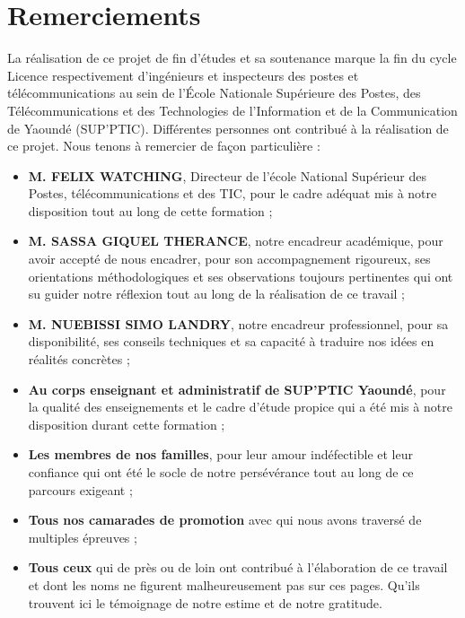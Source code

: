 \chapter*{Remerciements}

La réalisation de ce projet de fin d’études et sa soutenance marque la fin du cycle Licence respectivement d’ingénieurs et inspecteurs des postes et télécommunications au sein de l’École Nationale Supérieure des Postes, des Télécommunications et des Technologies de l’Information et de la Communication de Yaoundé (SUP’PTIC). Différentes personnes ont contribué à la réalisation de ce projet. Nous tenons à remercier de façon particulière :

\begin{itemize}
    \item \textbf{M. FELIX WATCHING}, Directeur de l’école National Supérieur des Postes, télécommunications et des TIC, pour le cadre adéquat mis à notre disposition tout au long de cette formation ;
    
    \item \textbf{M. SASSA GIQUEL THERANCE}, notre encadreur académique, pour avoir accepté de nous encadrer, pour son accompagnement rigoureux, ses orientations méthodologiques et ses observations toujours pertinentes qui ont su guider notre réflexion tout au long de la réalisation de ce travail ;
    
    \item \textbf{M. NUEBISSI SIMO LANDRY}, notre encadreur professionnel, pour sa disponibilité, ses conseils techniques et sa capacité à traduire nos idées en réalités concrètes ;
    
    \item \textbf{Au corps enseignant et administratif de SUP’PTIC Yaoundé}, pour la qualité des enseignements et le cadre d’étude propice qui a été mis à notre disposition durant cette formation ;
    
    \item \textbf{Les membres de nos familles}, pour leur amour indéfectible et leur confiance qui ont été le socle de notre persévérance tout au long de ce parcours exigeant ;
    
    \item \textbf{Tous nos camarades de promotion} avec qui nous avons traversé de multiples épreuves ;
    
    \item \textbf{Tous ceux} qui de près ou de loin ont contribué à l’élaboration de ce travail et dont les noms ne figurent malheureusement pas sur ces pages. Qu’ils trouvent ici le témoignage de notre estime et de notre gratitude.
\end{itemize}